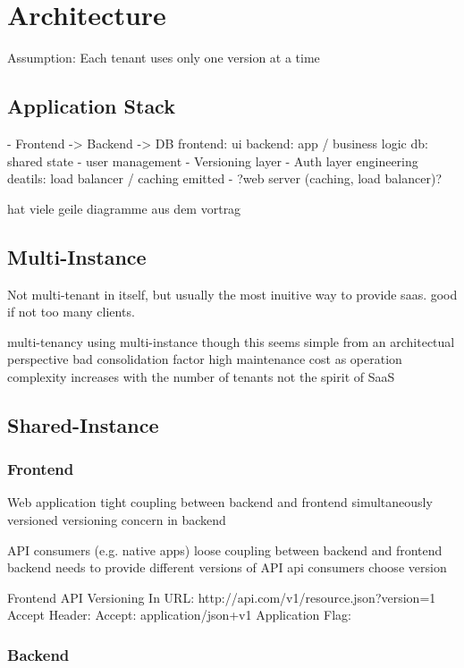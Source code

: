 \section{Architecture}

Assumption:
  Each tenant uses only one version at a time


\subsection{Application Stack}
- Frontend -> Backend -> DB
  frontend: ui
  backend: app / business logic
  db: shared state
  - user management
    - Versioning layer
    - Auth layer
  engineering deatils: load balancer / caching emitted
  - ?web server (caching, load balancer)?


hat viele geile diagramme aus dem vortrag

\subsection{Multi-Instance}

Not multi-tenant in itself, but usually the most inuitive way to provide saas. good if not too many clients.

multi-tenancy using multi-instance
though this seems simple from an architectual perspective
bad consolidation factor
high maintenance cost as operation complexity increases with the number of tenants
not the spirit of SaaS

\subsection{Shared-Instance}

\subsubsection{Frontend}
  Web application
  tight coupling between backend and frontend
  simultaneously versioned
  versioning concern in backend

  API consumers (e.g. native apps)
  loose coupling between backend and frontend
  backend needs to provide different versions of API
  api consumers choose version

  Frontend API Versioning
    In URL:
      http://api.com/v1/resource.json?version=1
    Accept Header:
      Accept: application/json+v1
    Application Flag:

\subsubsection{Backend}
